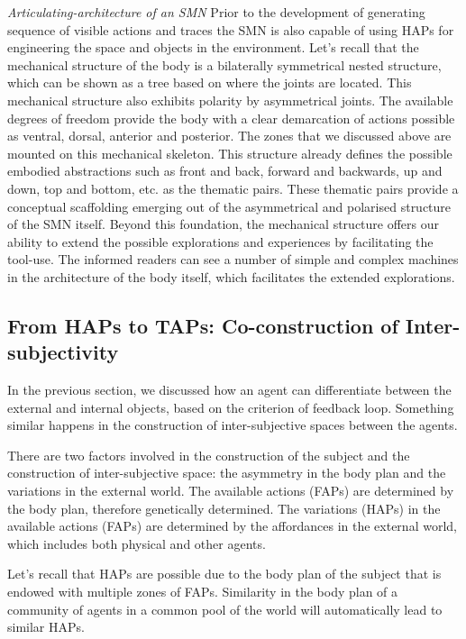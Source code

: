 \emph{Articulating-architecture of an SMN} Prior to the development of generating sequence of visible actions and traces the SMN is also capable of using HAPs for engineering the space and objects in the environment. Let's recall that the mechanical structure of the body is a bilaterally symmetrical nested structure, which can be shown as a tree based on where the joints are located. This mechanical structure also exhibits polarity by asymmetrical joints. The available degrees of freedom provide the body with a clear demarcation of actions possible as ventral, dorsal, anterior and posterior. The zones that we discussed above are mounted on this mechanical skeleton. This structure already defines the possible embodied abstractions such as front and back, forward and backwards, up and down, top and bottom, etc. as the thematic pairs. These thematic pairs provide a conceptual scaffolding emerging out of the asymmetrical and polarised structure of the SMN itself. Beyond this foundation, the mechanical structure offers our ability to extend the possible explorations and experiences by facilitating the tool-use. The informed readers can see a number of simple and complex machines in the architecture of the body itself, which facilitates the extended explorations. 

\subsection{From HAPs to TAPs: Co-construction of Inter-subjectivity}
In the previous section, we discussed how an agent can differentiate between the external and internal objects, based on the criterion of feedback loop. Something similar happens in the construction of inter-subjective spaces between the agents. 

There are two factors involved in the construction of the subject and the construction of inter-subjective space: the asymmetry in the body plan and the variations in the external world. The available actions (FAPs) are determined by the body plan, therefore genetically determined. The variations (HAPs) in the available actions (FAPs) are determined by the affordances in the external world, which includes both physical and other agents. 

Let's recall that HAPs are possible due to the body plan of the subject that is endowed with multiple zones of FAPs. Similarity in the body plan of a community of agents in a common pool of the world will automatically lead to similar HAPs. 

